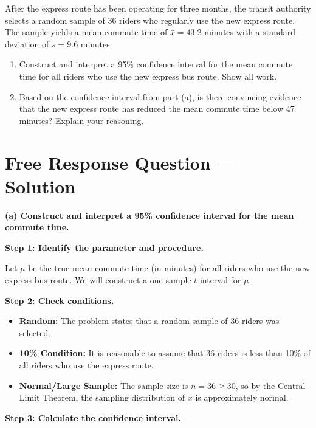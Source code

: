 \documentclass[12pt]{article}
\begin{document}
After the express route has been operating for three months, the transit authority selects a random sample of 36 riders who regularly use the new express route. The sample yields a mean commute time of $\bar{x} = 43.2$ minutes with a standard deviation of $s = 9.6$ minutes.

\begin{enumerate}[label=(\alph*)]
    \item Construct and interpret a 95\% confidence interval for the mean commute time for all riders who use the new express bus route. Show all work.

    \item Based on the confidence interval from part (a), is there convincing evidence that the new express route has reduced the mean commute time below 47 minutes? Explain your reasoning.
\end{enumerate}

\newpage

\section*{Free Response Question --- Solution}

\noindent\textbf{(a) Construct and interpret a 95\% confidence interval for the mean commute time.}

\textbf{Step 1: Identify the parameter and procedure.}

Let $\mu$ be the true mean commute time (in minutes) for all riders who use the new express bus route. We will construct a one-sample $t$-interval for $\mu$.

\textbf{Step 2: Check conditions.}

\begin{itemize}
    \item \textbf{Random:} The problem states that a random sample of 36 riders was selected. \checkmark
    \item \textbf{10\% Condition:} It is reasonable to assume that 36 riders is less than 10\% of all riders who use the express route. \checkmark
    \item \textbf{Normal/Large Sample:} The sample size is $n = 36 \geq 30$, so by the Central Limit Theorem, the sampling distribution of $\bar{x}$ is approximately normal. \checkmark
\end{itemize}

\textbf{Step 3: Calculate the confidence interval.}
\end{document}
